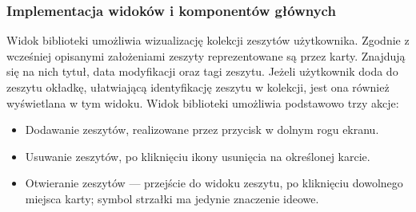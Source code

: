 \subsubsection{Implementacja widoków i komponentów głównych}
Widok biblioteki umożliwia wizualizację kolekcji zeszytów użytkownika. Zgodnie z wcześniej opisanymi założeniami zeszyty
reprezentowane są przez karty. Znajdują się na nich tytuł, data modyfikacji oraz tagi zeszytu.
Jeżeli użytkownik doda do zeszytu okładkę, ułatwiającą identyfikację zeszytu w kolekcji,
jest ona również wyświetlana w tym widoku. Widok biblioteki umożliwia podstawowo trzy akcje:
\begin{itemize}
	\item Dodawanie zeszytów, realizowane przez przycisk w dolnym rogu ekranu.
	\item Usuwanie zeszytów, po kliknięciu ikony usunięcia na określonej karcie.
	\item Otwieranie zeszytów — przejście do widoku zeszytu, po kliknięciu dowolnego miejsca karty; symbol strzałki
	      ma jedynie znaczenie ideowe.
\end{itemize}
